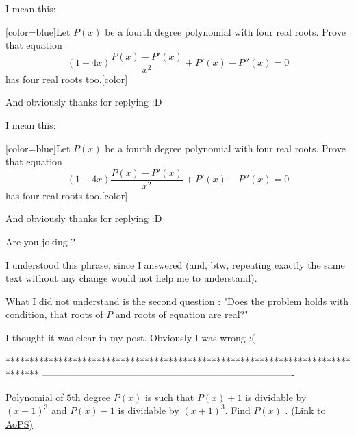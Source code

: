 \begin{solution}
	I mean this: 

[color=blue]Let $ P(x)$ be a fourth degree polynomial with four real roots. Prove that equation
\[ (1 - 4x) \frac {P(x) - P'(x)}{x^2} + P'(x) - P''(x) = 0\]
has four real roots too.[\/color]

And obviously thanks for replying  :D
\end{solution}



\begin{solution}
	\begin{tcolorbox}I mean this: 

[color=blue]Let $ P(x)$ be a fourth degree polynomial with four real roots. Prove that equation
\[ (1 - 4x) \frac {P(x) - P'(x)}{x^2} + P'(x) - P''(x) = 0\]
has four real roots too.[\/color]

And obviously thanks for replying  :D\end{tcolorbox}

Are you joking ?

I understood this phrase, since I answered (and, btw, repeating exactly the same text without any change would not help me to understand).

What I did not understand is the second question : "Does the problem holds with condition, that roots of $ P$ and roots of equation are real?"

I thought it was clear in my post.
Obviously I was wrong :(
\end{solution}
*******************************************************************************
-------------------------------------------------------------------------------

\begin{problem}
	Polynomial of $ 5$th degree $ P(x)$ is such that $ P(x)+1$ is dividable by $ (x-1)^3$ and $ P(x)-1$ is dividable by $ (x+1)^3$.
Find $ P(x)$ .
	\flushright \href{https://artofproblemsolving.com/community/c6h300769}{(Link to AoPS)}
\end{problem}



